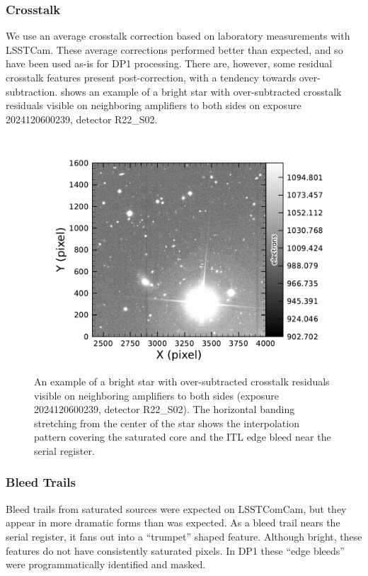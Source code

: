 \subsubsection{Crosstalk}
We use an average crosstalk correction based on laboratory measurements with LSSTCam.
These average corrections performed better than expected, and so have been used as-is for DP1 processing.
There are, however, some residual crosstalk features present post-correction, with a tendency towards over-subtraction.
 shows an example  of a bright star with over-subtracted crosstalk residuals visible on neighboring amplifiers to both sides on exposure 2024120600239, detector R22\_S02.
\begin{figure}[htb!]
  \centering
  \includegraphics[width=0.98\linewidth]{figures/dp1_isr_anomalies-crosstalk_residual.pdf}
  \label{fig:crosstalk_residual}
  \caption{
    An example of a bright star with over-subtracted crosstalk residuals visible on neighboring amplifiers to both sides (exposure 2024120600239, detector R22\_S02).
    The horizontal banding stretching from the center of the star shows the interpolation pattern covering the saturated core and the ITL edge bleed near the serial register.
  }
\end{figure}

\subsubsection{Bleed Trails}
Bleed trails from saturated sources were expected on LSSTComCam, but they appear in more dramatic forms than was expected.
As a bleed trail nears the serial register, it fans out into a ``trumpet'' shaped feature.
Although bright, these features do not have consistently saturated pixels.
In DP1 these ``edge bleeds'' were programmatically identified and masked.

